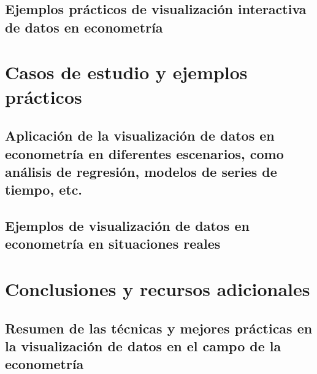 \documentclass[
  a4paper,
]{article}
\begin{document}
\hypertarget{ejemplos-pruxe1cticos-de-visualizaciuxf3n-interactiva-de-datos-en-econometruxeda}{%
\subsection{Ejemplos prácticos de visualización interactiva de datos en
econometría}\label{ejemplos-pruxe1cticos-de-visualizaciuxf3n-interactiva-de-datos-en-econometruxeda}}

\hypertarget{casos-de-estudio-y-ejemplos-pruxe1cticos}{%
\section{Casos de estudio y ejemplos
prácticos}\label{casos-de-estudio-y-ejemplos-pruxe1cticos}}

\hypertarget{aplicaciuxf3n-de-la-visualizaciuxf3n-de-datos-en-econometruxeda-en-diferentes-escenarios-como-anuxe1lisis-de-regresiuxf3n-modelos-de-series-de-tiempo-etc.}{%
\subsection{Aplicación de la visualización de datos en econometría en
diferentes escenarios, como análisis de regresión, modelos de series de
tiempo,
etc.}\label{aplicaciuxf3n-de-la-visualizaciuxf3n-de-datos-en-econometruxeda-en-diferentes-escenarios-como-anuxe1lisis-de-regresiuxf3n-modelos-de-series-de-tiempo-etc.}}

\hypertarget{ejemplos-de-visualizaciuxf3n-de-datos-en-econometruxeda-en-situaciones-reales}{%
\subsection{Ejemplos de visualización de datos en econometría en
situaciones
reales}\label{ejemplos-de-visualizaciuxf3n-de-datos-en-econometruxeda-en-situaciones-reales}}

\hypertarget{conclusiones-y-recursos-adicionales}{%
\section{Conclusiones y recursos
adicionales}\label{conclusiones-y-recursos-adicionales}}

\hypertarget{resumen-de-las-tuxe9cnicas-y-mejores-pruxe1cticas-en-la-visualizaciuxf3n-de-datos-en-el-campo-de-la-econometruxeda}{%
\subsection{Resumen de las técnicas y mejores prácticas en la
visualización de datos en el campo de la
econometría}\label{resumen-de-las-tuxe9cnicas-y-mejores-pruxe1cticas-en-la-visualizaciuxf3n-de-datos-en-el-campo-de-la-econometruxeda}}
\end{document}
